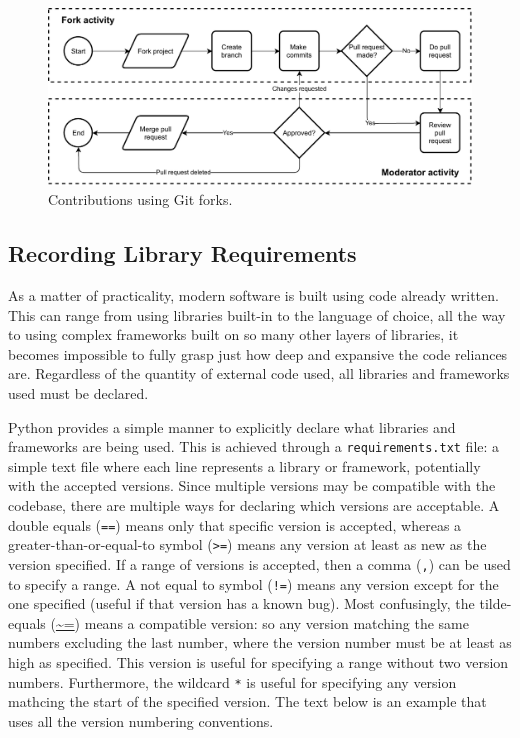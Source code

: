 \documentclass[11pt]{article}
\begin{document}
\begin{figure}[t!]
    \centering
    \includegraphics[width=1.0\textwidth]{figures/git_using_forks.pdf}
    \caption{Contributions using Git forks.}
    \label{fig:git-forks}
\end{figure}

\subsection{Recording Library Requirements}

As a matter of practicality, modern software is built using code already written. This can range from using libraries built-in to the language of choice, all the way to using complex frameworks built on so many other layers of libraries, it becomes impossible to fully grasp just how deep and expansive the code reliances are. Regardless of the quantity of external code used, all libraries and frameworks used must be declared.

Python provides a simple manner to explicitly declare what libraries and frameworks are being used. This is achieved through a \texttt{requirements.txt} file: a simple text file where each line represents a library or framework, potentially with the accepted versions. Since multiple versions may be compatible with the codebase, there are multiple ways for declaring which versions are acceptable. A double equals (\texttt{==}) means only that specific version is accepted, whereas a greater-than-or-equal-to symbol (\texttt{>=}) means any version at least as new as the version specified. If a range of versions is accepted, then a comma (\texttt{,}) can be used to specify a range. A not equal to symbol (\texttt{!=}) means any version except for the one specified (useful if that version has a known bug). Most confusingly, the tilde-equals (\url{~=}) means a compatible version: so any version matching the same numbers excluding the last number, where the version number must be at least as high as specified. This version is useful for specifying a range without two version numbers. Furthermore, the wildcard \texttt{*} is useful for specifying any version mathcing the start of the specified version. The text below is an example that uses all the version numbering conventions.
\end{document}
